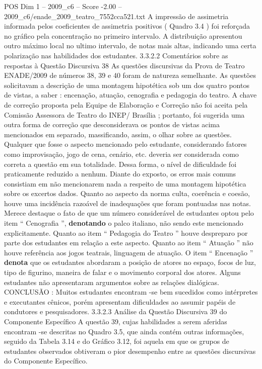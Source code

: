 \begin{textsample}{POS Dim 1 – 2009\_c6 – Score -2.00 – 2009\_c6/enade\_2009\_teatro\_7552cca521.txt}
A impressão de assimetria informada pelos coeficientes de assimetria positivos ( Quadro 3.4 ) foi reforçada no gráfico pela concentração no primeiro intervalo.
A distribuição apresentou outro máximo local no ultimo intervalo, de notas mais altas, indicando uma certa polarização nas habilidades dos estudantes. 3.3.2.2 Comentários sobre as respostas à Questão Discursiva 38 As questões discursivas da Prova de Teatro ENADE/2009 de números 38, 39 e 40 foram de natureza semelhante.
As questões solicitavam a descrição de uma montagem hipotética sob um dos quatro pontos de vistas, a saber : encenação, atuação, cenografia e pedagogia do teatro.
A chave de correção proposta pela Equipe de Elaboração e Correção não foi aceita pela Comissão Assessora de Teatro do INEP/ Brasília ; portanto, foi sugerida uma outra forma de correção que desconsiderava os pontos de vistas acima mencionados em separado, massificando, assim, o olhar sobre as questões.
Qualquer que fosse o aspecto mencionado pelo estudante, considerando fatores como improvisação, jogo de cena, cenário, etc. deveria ser considerada como correta a questão em sua totalidade.
Dessa forma, o nível de dificuldade foi praticamente reduzido a nenhum.
Diante do exposto, os erros mais comuns consistiam em não mencionarem nada a respeito de uma montagem hipotética sobre os excertos dados.
Quanto ao aspecto da norma culta, coerência e coesão, houve uma incidência razoável de inadequações que foram pontuadas nas notas.
Merece destaque o fato de que um número considerável de estudantes optou pelo item “ Cenografia ”, \textbf{denotando} o palco italiano, não sendo este mencionado explicitamente.
Quanto ao item “ Pedagogia do Teatro ” houve despreparo por parte dos estudantes em relação a este aspecto.
Quanto ao item “ Atuação ” não houve referência aos jogos teatrais, linguagem de atuação.
O item “ Encenação ” \textbf{denota} que os estudantes abordaram a posição de atores no espaço, focos de luz, tipo de figurino, maneira de falar e o movimento corporal dos atores.
Alguns estudantes não apresentaram argumentos sobre as relações dialógicas.
CONCLUSÃO : Muitos estudantes encontram -se bem sucedidos como intérpretes e executantes cênicos, porém apresentam dificuldades ao assumir papéis de condutores e pesquisadores. 3.3.2.3 Análise da Questão Discursiva 39 do Componente Específico A questão 39, cujas habilidades a serem aferidas encontram -se descritas no Quadro 3.5, que ainda contém outras informações, seguido da Tabela 3.14 e do Gráfico 3.12, foi aquela em que os grupos de estudantes observados obtiveram o pior desempenho entre as questões discursivas do Componente Específico.

\end{textsample}

